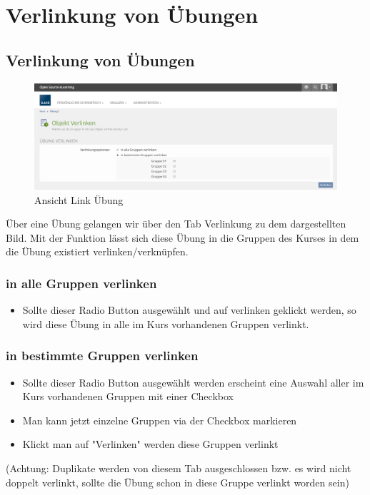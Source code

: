 \chapter{Verlinkung von Übungen}\label{linkUebung}
\minitoc
\clearpage

\section{Verlinkung von Übungen}
\begin{figure}
	\centering
	\includegraphics[width=1\textwidth]{img/linkUebung.png}
	\caption{Ansicht Link Übung}
\end{figure}

Über eine Übung gelangen wir über den Tab Verlinkung zu dem dargestellten Bild. 
Mit der Funktion lässt sich diese Übung in die Gruppen des Kurses in dem die Übung existiert verlinken/verknüpfen. 

\subsection*{in alle Gruppen verlinken}
\begin{itemize}
	\item Sollte dieser Radio Button ausgewählt und auf verlinken geklickt werden, so wird diese Übung in alle im Kurs vorhandenen Gruppen verlinkt. 
\end{itemize}

\subsection*{in bestimmte Gruppen verlinken}
\begin{itemize}
	\item Sollte dieser Radio Button ausgewählt werden erscheint eine Auswahl aller im Kurs vorhandenen Gruppen mit einer Checkbox
	\item Man kann jetzt einzelne Gruppen via der Checkbox markieren
	\item Klickt man auf "Verlinken" werden diese Gruppen verlinkt
\end{itemize}

(Achtung: Duplikate werden von diesem Tab ausgeschlossen bzw. es wird nicht doppelt verlinkt, sollte die Übung schon in diese Gruppe verlinkt worden sein) 
\clearpage